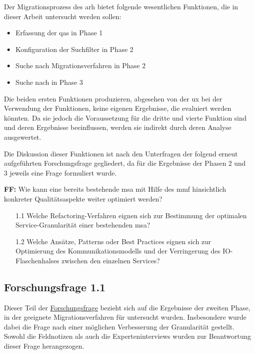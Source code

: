 Der Migrationsprozess des \gls{arh} bietet folgende wesentlichen Funktionen, die in dieser Arbeit untersucht werden sollen:
\begin{itemize}
	\item Erfassung der \glspl{qa} in Phase 1
	\item Konfiguration der Suchfilter in Phase 2
	\item Suche nach Migrationsverfahren in Phase 2
	\item Suche nach \bpp in Phase 3
\end{itemize}
Die beiden ersten Funktionen produzieren, abgesehen von der \gls{ux} bei der Verwendung der Funktionen, keine eigenen Ergebnisse, die evaluiert werden könnten.
Da sie jedoch die Voraussetzung für die dritte und vierte Funktion sind und deren Ergebnisse beeinflussen, werden sie indirekt durch deren Analyse ausgewertet.

Die Diskussion dieser Funktionen ist nach den Unterfragen der folgend erneut aufgeführten Forschungsfrage gegliedert, da für die Ergebnisse der Phasen 2 und 3 jeweils eine Frage formuliert wurde.

\textbf{FF:} Wie kann eine bereits bestehende \acrlong{msa} mit Hilfe des \acrfull{mmf} hinsichtlich konkreter Qualitätsaspekte weiter optimiert werden?
\begin{enumerate}
	\item[1.1] Welche Refactoring-Verfahren eignen sich zur Bestimmung der optimalen Service-Granularität einer bestehenden \acrlong{msa}?
	\item[1.2] Welche Ansätze, Patterns oder Best Practices eignen sich zur Optimierung des Kom\-mu\-ni\-ka\-tions\-mo\-dells und der Verringerung des IO-Flaschenhalses zwischen den einzelnen Services?
\end{enumerate}



\subsection{Forschungsfrage 1.1}
Dieser Teil der \hyperref[forschungsfrage:1]{Forschungsfrage} bezieht sich auf die Ergebnisse der zweiten Phase, in der geeignete Migrationsverfahren für \jf untersucht wurden.
Insbesondere wurde dabei die Frage nach einer möglichen Verbesserung der Granularität gestellt.
Sowohl die Feldnotizen als auch die Experteninterviews wurden zur Beantwortung dieser Frage herangezogen.

